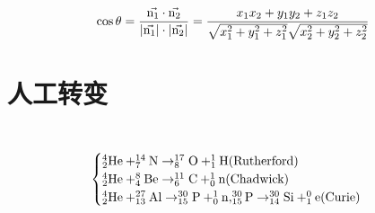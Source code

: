 \documentclass[UTF8]{article}
\begin{document}
$$
\cos\theta=\frac{\vec{\rm{n_1}}\cdot\vec{\rm{n_2}}  }{|\vec{\rm{n_1}}|\cdot|\vec{\rm{n_2}}|}=\frac{x_{1} x_{2}+y_{1} y_{2}+z_{1} z_{2}}{\sqrt{x_{1}^{2}+y_{1}^{2}+z_{1}^{2}} \sqrt{x_{2}^{2}+y_{2}^{2}+z_{2}^{2}}}
$$
\section{人工转变}\\ 
$$
\begin{cases}\rm
    _{2}^{4}He+ _{7}^{14}N \rightarrow _{8}^{17}O + _{1}^{1}H(Rutherford)\\\rm
    _{2}^{4}He+ _{4}^{8}Be \rightarrow _{6}^{11}C + _{0}^{1}n(Chadwick)\\\rm
    _{2}^{4}He+ _{13}^{27}Al \rightarrow _{15}^{30}P + _{0}^{1}n,_{15}^{30}P \rightarrow _{14}^{30}Si + _{1}^{0}e(Curie)
    \end{cases}
$$
\end{document}
